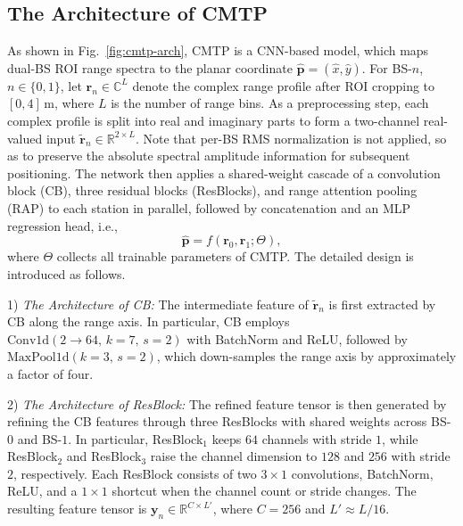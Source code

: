\documentclass[sigconf]{acmart}
\begin{document}
\subsection{The Architecture of CMTP}
As shown in Fig.~\ref{fig:cmtp-arch}, CMTP is a CNN-based model, which maps dual-BS ROI range spectra to the planar coordinate $\hat{\mathbf{p}}=(\hat{x},\hat{y})$. For BS-$n$, $n\in\{0,1\}$, let $\mathbf{r}_n\in\mathbb{C}^{L}$ denote the complex range profile after ROI cropping to $[0,4]\,\mathrm{m}$, where $L$ is the number of range bins. As a preprocessing step, each complex profile is split into real and imaginary parts to form a two-channel real-valued input $\tilde{\mathbf{r}}_n\in\mathbb{R}^{2\times L}.$
Note that per-BS RMS normalization is not applied, so as to preserve the absolute spectral amplitude information for subsequent positioning. The network then applies a shared-weight cascade of a convolution block (CB), three residual blocks (ResBlocks), and range attention pooling (RAP) to each station in parallel, followed by concatenation and an MLP regression head, i.e.,
\begin{equation}
\hat{\mathbf{p}}=f(\mathbf{r}_0,\mathbf{r}_1;\Theta),
\end{equation}
where $\Theta$ collects all trainable parameters of CMTP. The detailed design is introduced as follows.

1) \textit{The Architecture of CB:}
The intermediate feature of $\tilde{\mathbf{r}}_n$ is first extracted by CB along the range axis. In particular, CB employs $\mathrm{Conv1d}(2\to 64,\,k=7,\,s=2)$ with BatchNorm and ReLU, followed by $\mathrm{MaxPool1d}(k=3,\,s=2)$, which down-samples the range axis by approximately a factor of four.

2) \textit{The Architecture of ResBlock:}
The refined feature tensor is then generated by refining the CB features through three ResBlocks with shared weights across BS-$0$ and BS-$1$. In particular, ResBlock$_1$ keeps $64$ channels with stride $1$, while ResBlock$_2$ and ResBlock$_3$ raise the channel dimension to $128$ and $256$ with stride $2$, respectively. Each ResBlock consists of two $3\times 1$ convolutions, BatchNorm, ReLU, and a $1\times 1$ shortcut when the channel count or stride changes. The resulting feature tensor is $\mathbf{y}_n\in\mathbb{R}^{C\times L'}$, where $C=256$ and $L'\approx L/16$.
\end{document}
